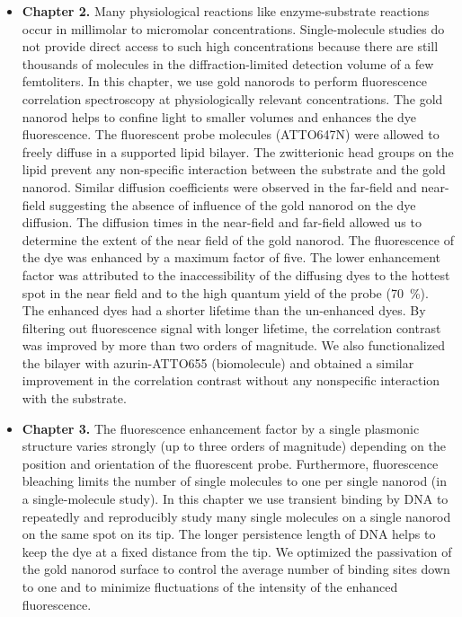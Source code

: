 \begin{itemize}
	\item \textbf{Chapter 2.} Many physiological reactions like enzyme-substrate reactions occur in millimolar to micromolar concentrations.
	Single-molecule studies do not provide direct access to such high concentrations because there are still thousands of molecules in the diffraction-limited detection volume of a few femtoliters.
	In this chapter, we use gold nanorods to perform fluorescence correlation spectroscopy at physiologically relevant concentrations.
	The gold nanorod helps to confine light to smaller volumes and enhances the dye fluorescence.
	The fluorescent probe molecules (ATTO647N) were allowed to freely diffuse in a supported lipid bilayer.
	The zwitterionic head groups on the lipid prevent any non-specific interaction between the substrate and the gold nanorod.
	Similar diffusion coefficients were observed in the far-field and near-field suggesting the absence of influence of the gold nanorod on the dye diffusion.
	The diffusion times in the near-field and far-field allowed us to determine the extent of the near field of the gold nanorod.
	The fluorescence of the dye was enhanced by a maximum factor of five.
	The lower enhancement factor was attributed to the inaccessibility of the diffusing dyes to the hottest spot in the near field and to the high quantum yield of the probe (\SI{70}{\percent}).
	The enhanced dyes had a shorter lifetime than the un-enhanced dyes.
	By filtering out fluorescence signal with longer lifetime, the correlation contrast was improved by more than two orders of magnitude.
	We also functionalized the bilayer with azurin-ATTO655 (biomolecule) and obtained a similar improvement in the correlation contrast without any nonspecific interaction with the substrate.
	
	\item \textbf{Chapter 3.} The fluorescence enhancement factor by a single plasmonic structure varies strongly  (up to three orders of magnitude) depending on the position and orientation of the fluorescent probe.
	Furthermore, fluorescence bleaching limits the number of single molecules to one per single nanorod (in a single-molecule study).
	In this chapter we use transient binding by DNA to repeatedly and reproducibly study many single molecules on a single nanorod on the same spot on its tip.
	The longer persistence length of DNA helps to keep the dye at a fixed distance from the tip. We optimized the passivation of the gold nanorod surface to control the average number of binding sites down to one and to minimize fluctuations of the intensity of the enhanced fluorescence.


\end{itemize}
